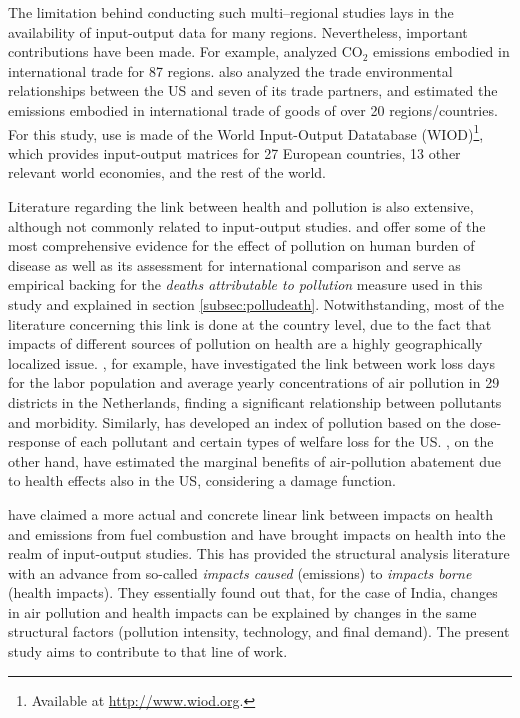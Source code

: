 \documentclass[a4paper,12pt, ]{article}
\begin{document}
The limitation behind conducting such multi--regional studies lays in the availability of input-output data for many regions. Nevertheless, important contributions have been made. For example, \citet{peterspost-kyoto2008} analyzed CO$_2$ emissions embodied in international trade for 87 regions. \citet{weberembodied2007} also analyzed the trade environmental relationships between the US and seven of its trade partners, and \citet{ahmadcarbon2003} estimated the emissions embodied in international trade of goods of over 20 regions/countries. For this study, use is made of the World Input-Output Datatabase (WIOD)\footnote{Available at \url{http://www.wiod.org}.}, which provides input-output matrices for 27 European countries, 13 other relevant world economies, and the rest of the world.

Literature regarding the link between health and pollution is also extensive, although not commonly related to input-output studies. \citet{cohenurban2004} and \citet{ostro2004outdoor} offer some of the most comprehensive evidence for the effect of pollution on human burden of disease as well as its assessment for international comparison and serve as empirical backing for the \textit{deaths attributable to pollution} measure used in this study and explained in section \ref{subsec:polludeath}. Notwithstanding, most of the literature concerning this link is done at the country level, due to the fact that impacts of different sources of pollution on health are a highly geographically localized issue. \citet{zuidemahealth1997}, for example, have investigated the link between work loss days for the labor population and average yearly concentrations of air pollution in 29 districts in the Netherlands, finding a significant relationship between pollutants and morbidity. Similarly, \citet{khannameasuring2000} has developed an index of pollution based on the dose-response of each pollutant and certain types of welfare loss for the US. \citet{cifuenteseconomic1993}, on the other hand, have estimated the marginal benefits of air-pollution abatement due to health effects also in the US, considering a damage function. 

\citet{mukhopadhyayforsell2005} have claimed a more actual and concrete linear link between impacts on health and emissions from fuel combustion and have brought impacts on health into the realm of input-output studies. This has provided the structural analysis literature with an advance from so-called \textit{impacts caused} (emissions) to \textit{impacts borne} (health impacts). They essentially found out that, for the case of India, changes in air pollution and health impacts can be explained by changes in the same structural factors (pollution intensity, technology, and final demand). The present study aims to contribute to that line of work.
\end{document}
